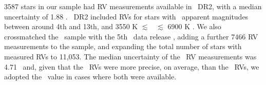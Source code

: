 3587 stars in our sample had RV measurements available in \gaia\ DR2, with a
median uncertainty of 1.88 \kms.
\gaia\ DR2 included RVs for stars with \gaia\ apparent magnitudes between
around 4th and 13th, and 3550 K $\lesssim$ \teff\ $\lesssim$ 6900 K
\citep{brown2018}.
We also crossmatched the \mct\ sample with the 5th \lamost\ data release
\citep{cui2012, xiang2019}, adding a further 7466 RV measurements to the
sample, and expanding the total number of stars with measured RVs to 11,053.
The median uncertainty of the \lamost\ RV measurements was 4.71 \kms\ and,
given that the \gaia\ RVs were more precise, on average, than the \lamost\
RVs, we adopted the \gaia\ value in cases where both were available.
